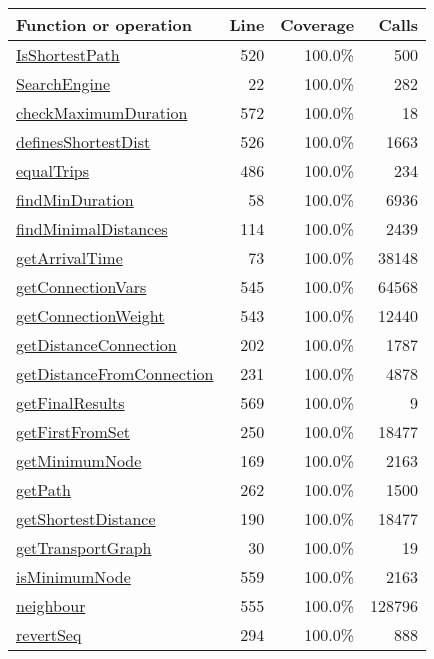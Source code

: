 \begin{longtable}{|l|r|r|r|}
\hline
Function or operation & Line & Coverage & Calls \\
\hline
\hline
\hyperref[IsShortestPath:520]{IsShortestPath} & 520&100.0\% & 500 \\
\hline
\hyperref[SearchEngine:22]{SearchEngine} & 22&100.0\% & 282 \\
\hline
\hyperref[checkMaximumDuration:572]{checkMaximumDuration} & 572&100.0\% & 18 \\
\hline
\hyperref[definesShortestDist:526]{definesShortestDist} & 526&100.0\% & 1663 \\
\hline
\hyperref[equalTrips:486]{equalTrips} & 486&100.0\% & 234 \\
\hline
\hyperref[findMinDuration:58]{findMinDuration} & 58&100.0\% & 6936 \\
\hline
\hyperref[findMinimalDistances:114]{findMinimalDistances} & 114&100.0\% & 2439 \\
\hline
\hyperref[getArrivalTime:73]{getArrivalTime} & 73&100.0\% & 38148 \\
\hline
\hyperref[getConnectionVars:545]{getConnectionVars} & 545&100.0\% & 64568 \\
\hline
\hyperref[getConnectionWeight:543]{getConnectionWeight} & 543&100.0\% & 12440 \\
\hline
\hyperref[getDistanceConnection:202]{getDistanceConnection} & 202&100.0\% & 1787 \\
\hline
\hyperref[getDistanceFromConnection:231]{getDistanceFromConnection} & 231&100.0\% & 4878 \\
\hline
\hyperref[getFinalResults:569]{getFinalResults} & 569&100.0\% & 9 \\
\hline
\hyperref[getFirstFromSet:250]{getFirstFromSet} & 250&100.0\% & 18477 \\
\hline
\hyperref[getMinimumNode:169]{getMinimumNode} & 169&100.0\% & 2163 \\
\hline
\hyperref[getPath:262]{getPath} & 262&100.0\% & 1500 \\
\hline
\hyperref[getShortestDistance:190]{getShortestDistance} & 190&100.0\% & 18477 \\
\hline
\hyperref[getTransportGraph:30]{getTransportGraph} & 30&100.0\% & 19 \\
\hline
\hyperref[isMinimumNode:559]{isMinimumNode} & 559&100.0\% & 2163 \\
\hline
\hyperref[neighbour:555]{neighbour} & 555&100.0\% & 128796 \\
\hline
\hyperref[revertSeq:294]{revertSeq} & 294&100.0\% & 888 \\

\end{longtable}
